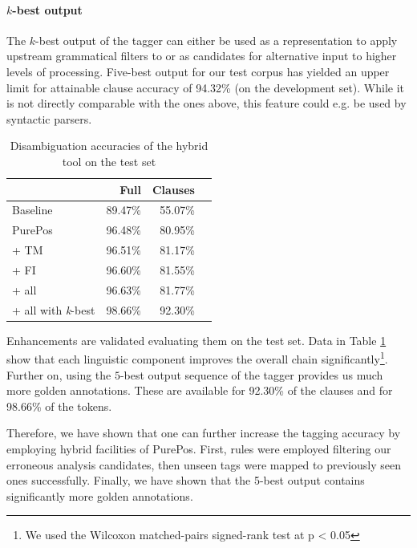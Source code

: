 
\paragraph{$k$-best output}
The $k$-best output of the tagger can either be used as a representation to apply upstream grammatical filters to or as candidates for alternative input to higher levels of processing. 
Five-best output for our test corpus has yielded an upper limit for attainable clause accuracy of 94.32\% (on the development set). 
While it is not directly comparable with the ones above, this feature could e.g. be used by syntactic parsers.


\begin{table}[H]
\centering
\caption{Disambiguation accuracies of the hybrid tool on the test set}
\label{tab:oldhun-test}
\begin{tabular}{l r r r}
\hline
 & Full & Clauses  \\
\hline
Baseline  & 89.47\% & 55.07\% \\
PurePos  & 96.48\% & 80.95\% \\
\hspace{0.2cm} + TM  & 96.51\% & 81.17\% \\
\hspace{0.2cm} + FI  & 96.60\% & 81.55\% \\
\hspace{0.2cm} + all  & 96.63\% & 81.77\% \\
\hspace{0.2cm} + all with \emph{k}-best  & 98.66\% & 92.30\% \\
\hline
\end{tabular}
\end{table}
 
Enhancements are validated evaluating them on the test set.
Data in Table \ref{tab:oldhun-test} show that each linguistic component improves the overall chain significantly\footnote{We used the Wilcoxon matched-pairs signed-rank test at p < 0.05}.
Further on, using the $5$-best output sequence of the tagger provides us much more golden annotations. 
These are available for 92.30\% of the clauses and for 98.66\% of the tokens.

Therefore, we have shown that one can further increase the tagging accuracy by employing hybrid facilities of PurePos. 
First, rules were employed filtering our erroneous analysis candidates, then unseen tags were mapped to previously seen ones successfully. 
Finally, we have shown that the 5-best output contains significantly more golden annotations.



